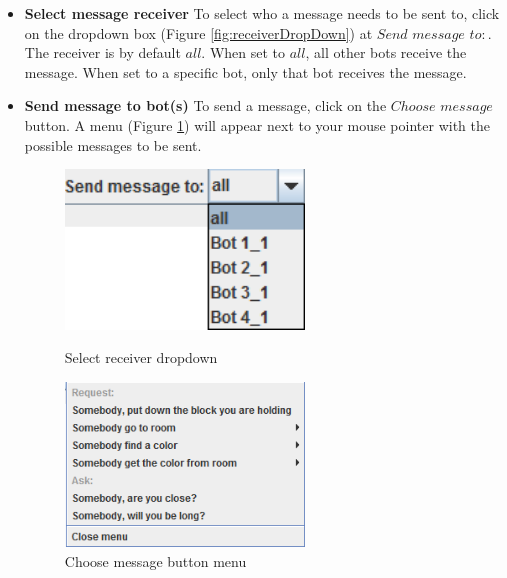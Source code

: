 \begin{itemize}

\item \textbf{Select message receiver}
To select who a message needs to be sent to, click on the dropdown box (Figure \ref{fig:receiverDropDown}) at $Send$ $message$ $to:$. The receiver is by default $all$.
When set to $all$, all other bots receive the message. When set to a specific bot, only that bot receives the message.

\item \textbf{Send message to bot(s)}
To send a message, click on the $Choose$ $message$ button. A menu (Figure \ref{fig:messageBot}) will appear next to your mouse pointer with the possible messages to be sent.

\begin{figure}[h]
\begin{minipage}{0.48\textwidth}
  \centering
  \includegraphics[width=0.6\textwidth]{HumanPlayerGUI/hpg-bot-receiver.png}
  \caption{Select receiver dropdown}
  \label{fig:receiverDropDown}
\end{minipage}\hfill
\begin{minipage}{0.48\textwidth}
  \centering
  \includegraphics[width=0.6\textwidth]{HumanPlayerGUI/hpg-bot-message.png}
  \caption{Choose message button menu}
  \label{fig:messageBot}
\end{minipage}
\end{figure}



\end{itemize}
